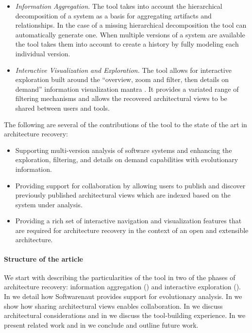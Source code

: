 \documentclass[preprint,12pt]{elsarticle}
\begin{document}
\begin{itemize}
\item {\em Information Aggregation.} The tool takes into account the hierarchical decomposition of a system as a basis for aggregating artifacts and relationships. In the case of a missing hierarchical decomposition the tool can automatically generate one. When multiple versions of a system are available the tool takes them into account to create a history by fully modeling each individual version.
\item {\em Interactive Visualization and Exploration.} The tool allows for interactive exploration built around the ``overview, zoom and filter, then details on demand'' information visualization mantra \cite{shneid-eyes}. It provides a variated range of filtering mechanisms and allows the recovered architectural views to be shared between users and tools.
\end{itemize}

The following are several of the contributions of the tool to the state of the art in architecture recovery:

\begin{itemize}
\item Supporting multi-version analysis of software systems and enhancing the exploration, filtering, and details on demand capabilities with evolutionary information.
\item Providing support for collaboration by allowing users to publish and discover previously published architectural views which are indexed based on the system under analysis.
\item Providing a rich set of interactive navigation and visualization features that are required for architecture recovery \cite{gallagher-archvis} in the context of an open and extensible architecture.
\end{itemize}



\paragraph{Structure of the article} We start with describing the particularities of the tool in two of the phases of architecture recovery: information aggregation () and interactive exploration (). In  we detail how Softwarenaut provides support for evolutionary analysis. In  we show how sharing architectural views enables collaboration. In  we discuss architectural considerations and in  we discuss the tool-building experience. In  we present related work and in  we conclude and outline future work.
\end{document}
